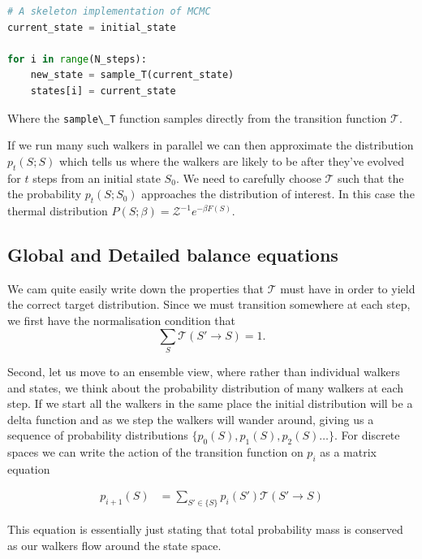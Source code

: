 \begin{lstlisting}[language=Python]
# A skeleton implementation of MCMC
current_state = initial_state

for i in range(N_steps):
    new_state = sample_T(current_state) 
    states[i] = current_state
\end{lstlisting}

Where the \passthrough{\lstinline!sample\_T!} function samples directly from the transition function \(\mathcal{T}\).

If we run many such walkers in parallel we can then approximate the distribution \(p_t(S; S)\) which tells us where the walkers are likely to be after they've evolved for \(t\) steps from an initial state \(S_0\). We need to carefully choose \(\mathcal{T}\) such that the the probability \(p_t(S; S_0)\) approaches the distribution of interest. In this case the thermal distribution \(P(S; \beta) = \mathcal{Z}^{-1} e^{-\beta F(S)}\).

\hypertarget{global-and-detailed-balance-equations}{%
\subsection{Global and Detailed balance equations}\label{global-and-detailed-balance-equations}}

We cam quite easily write down the properties that \(\mathcal{T}\) must have in order to yield the correct target distribution. Since we must transition somewhere at each step, we first have the normalisation condition that \[\sum\limits_S \mathcal{T}(S' \rightarrow S) = 1.\]

Second, let us move to an ensemble view, where rather than individual walkers and states, we think about the probability distribution of many walkers at each step. If we start all the walkers in the same place the initial distribution will be a delta function and as we step the walkers will wander around, giving us a sequence of probability distributions \(\{p_0(S), p_1(S), p_2(S)\ldots\}\). For discrete spaces we can write the action of the transition function on \(p_i\) as a matrix equation

\[\begin{aligned}
p_{i+1}(S) &= \sum_{S' \in \{S\}} p_i(S') \mathcal{T}(S' \rightarrow S)
\end{aligned}\]

This equation is essentially just stating that total probability mass is conserved as our walkers flow around the state space.

